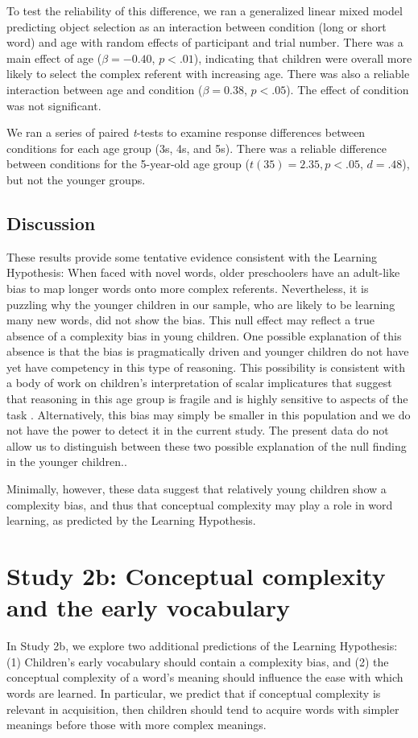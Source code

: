 To test the reliability of this difference, we ran a generalized linear mixed model predicting object selection as an interaction between condition (long or short word) and age with random effects of participant and trial number. There was a main effect of age ($\beta=-0.40$, $p <.01$), indicating that children were overall more likely to select the complex  referent with increasing age. There was also a reliable interaction between age and condition ($\beta=0.38$, $p <.05$). The effect of condition was not significant.

We  ran a series of paired {\it t}-tests to examine response differences between conditions for each age group (3s, 4s, and 5s). There was a reliable difference between conditions for the 5-year-old age group ($t(35) =2.35, p<.05$, $d=.48$), but not the younger groups. 

\subsection{Discussion}
These results provide some tentative evidence consistent with the Learning Hypothesis: When faced with novel words, older  preschoolers have an adult-like bias to map longer words onto more complex referents. Nevertheless, it is puzzling why the younger children in our sample, who are likely to be learning many new words, did not show the bias. This null effect may reflect a true absence of a complexity bias in young children. One possible explanation of this absence is that the bias is pragmatically driven and younger children do not have yet have competency in this type of reasoning. This possibility is consistent with a body of work on children's interpretation of scalar implicatures that suggest that reasoning in this age group is fragile and is highly sensitive to aspects of the task \cite<for a review, see>{horowitz2016the-trouble}. Alternatively, this bias may simply be smaller in this population and we do not have the power to detect it in the current study. The present data do not allow us to distinguish between these two possible explanation of the null finding in the younger children.. 

Minimally, however, these data  suggest that relatively young children show a complexity bias, and thus that conceptual complexity may play a role in word learning,  as predicted by the Learning Hypothesis.

\section{Study 2b: Conceptual complexity and the early vocabulary}
In Study 2b, we explore two additional predictions of the Learning Hypothesis:  (1) Children's early vocabulary should contain a complexity bias, and (2) the conceptual complexity of a word's meaning should influence the ease with which words are learned. In particular, we predict that if conceptual complexity is relevant in acquisition, then children should tend to acquire words with simpler meanings before those with more complex meanings.

